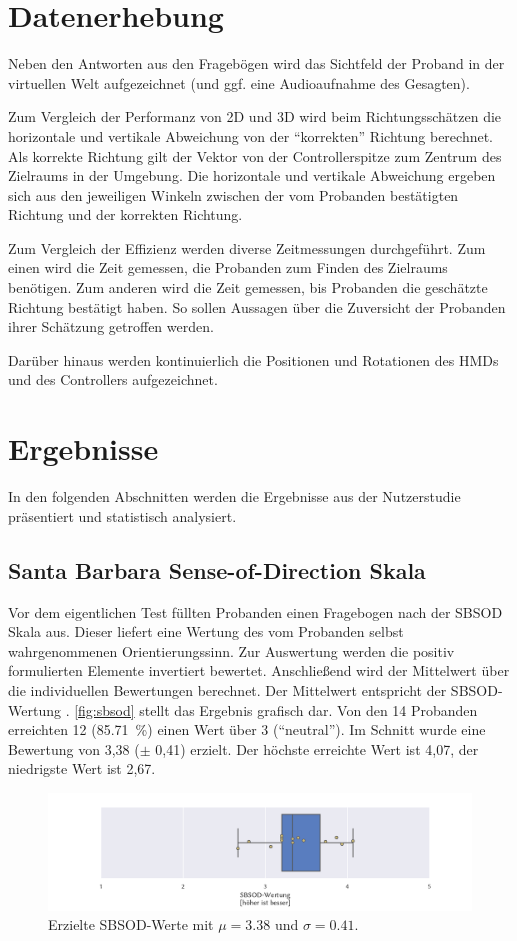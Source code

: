 \section{Datenerhebung}
Neben den Antworten aus den Fragebögen wird das Sichtfeld der Proband in der virtuellen Welt aufgezeichnet (und ggf. eine Audioaufnahme des Gesagten).

Zum Vergleich der Performanz von 2D und 3D wird beim Richtungsschätzen die horizontale und vertikale Abweichung von der \enquote{korrekten} Richtung berechnet.
Als korrekte Richtung gilt der Vektor von der Controllerspitze zum Zentrum des Zielraums in der Umgebung.
Die horizontale und vertikale Abweichung ergeben sich aus den jeweiligen Winkeln zwischen der vom Probanden bestätigten Richtung und der korrekten Richtung.

Zum Vergleich der Effizienz werden diverse Zeitmessungen durchgeführt.
Zum einen wird die Zeit gemessen, die Probanden zum Finden des Zielraums benötigen.
Zum anderen wird die Zeit gemessen, bis Probanden die geschätzte Richtung bestätigt haben.
So sollen Aussagen über die Zuversicht der Probanden ihrer Schätzung getroffen werden.

Darüber hinaus werden kontinuierlich die Positionen und Rotationen des HMDs und des Controllers aufgezeichnet.

\section{Ergebnisse}
In den folgenden Abschnitten werden die Ergebnisse aus der Nutzerstudie präsentiert und statistisch analysiert.

\subsection{Santa Barbara Sense-of-Direction Skala}
Vor dem eigentlichen Test füllten Probanden einen Fragebogen nach der SBSOD Skala aus.
Dieser liefert eine Wertung des vom Probanden selbst wahrgenommenen Orientierungssinn.
Zur Auswertung werden die positiv formulierten Elemente invertiert bewertet.
Anschließend wird der Mittelwert über die individuellen Bewertungen berechnet.
Der Mittelwert entspricht der SBSOD-Wertung \parencite{Hegarty2002}.
\autoref{fig:sbsod} stellt das Ergebnis grafisch dar.
Von den 14 Probanden erreichten 12 (\SI{85,71}{\percent}) einen Wert über 3 (\enquote{neutral}).
Im Schnitt wurde eine Bewertung von 3,38 ($\pm$ 0,41) erzielt.
Der höchste erreichte Wert ist 4,07, der niedrigste Wert ist 2,67.
\begin{figure}[h]
    \centering
    \includegraphics[trim={3cm, 0, 2.5cm, 0}, clip, width=\linewidth]{figures/analysis/sbsod}
    \caption{Erzielte SBSOD-Werte mit $\mu = \num{3,38}$ und $\sigma = \num{0,41}$.}
    \label{fig:sbsod}
\end{figure}

